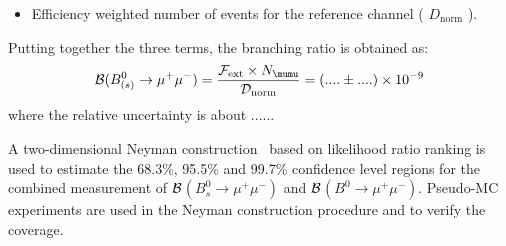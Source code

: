 \begin{itemize}
\item Efficiency weighted number of events for the reference channel ( ${D}_{\mathrm{norm}}$ ).
\end{itemize}

Putting together the three terms, the branching ratio is obtained as:
\[
  \BR (\Bmumu)= \frac{\mathcal{F}_{\mathrm{ext}} \times N_{\mumu}} {\mathcal{D}_{\mathrm{norm}}} = (.... \pm ....) \times 10^{-9}
\]
where the relative uncertainty is about ......

A two-dimensional Neyman construction~\cite{Neyman} based on likelihood
ratio ranking is used to estimate the 68.3\%, 95.5\% and 99.7\% confidence
level regions for the combined measurement of $\cal{B}$$(B^0_{s} \to \mu^+ \mu^-)$
and $\cal{B}$$(B^0 \to \mu^+ \mu^-)$. Pseudo-MC experiments are used in
the Neyman construction procedure and to verify the coverage.


\clearpage
